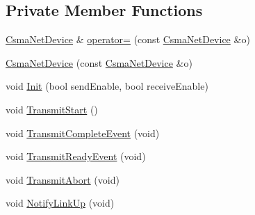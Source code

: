 \subsection*{Private Member Functions}
\begin{DoxyCompactItemize}
\item 
\hyperlink{classns3_1_1CsmaNetDevice}{Csma\+Net\+Device} \& \hyperlink{classns3_1_1CsmaNetDevice_a388accd5aee7b7aca18d458e4135198f}{operator=} (const \hyperlink{classns3_1_1CsmaNetDevice}{Csma\+Net\+Device} \&o)
\item 
\hyperlink{classns3_1_1CsmaNetDevice_a7fab551359f930d9b3884efb43a261c5}{Csma\+Net\+Device} (const \hyperlink{classns3_1_1CsmaNetDevice}{Csma\+Net\+Device} \&o)
\item 
void \hyperlink{classns3_1_1CsmaNetDevice_a566f2c2362d412be7c3c20e2f115842a}{Init} (bool send\+Enable, bool receive\+Enable)
\item 
void \hyperlink{classns3_1_1CsmaNetDevice_a4120db41aa1f41a5e1d59220b306f1e8}{Transmit\+Start} ()
\item 
void \hyperlink{classns3_1_1CsmaNetDevice_a3f908850087739df8d27e1a7207261aa}{Transmit\+Complete\+Event} (void)
\item 
void \hyperlink{classns3_1_1CsmaNetDevice_a2cb06577684f06daca6c24b4ef4e8910}{Transmit\+Ready\+Event} (void)
\item 
void \hyperlink{classns3_1_1CsmaNetDevice_ac6b19bd1a3d2f257a56c3bf8e026ad88}{Transmit\+Abort} (void)
\item 
void \hyperlink{classns3_1_1CsmaNetDevice_a4d01c6da5e8a31af9c3c8ff7bbe0e022}{Notify\+Link\+Up} (void)
\end{DoxyCompactItemize}
